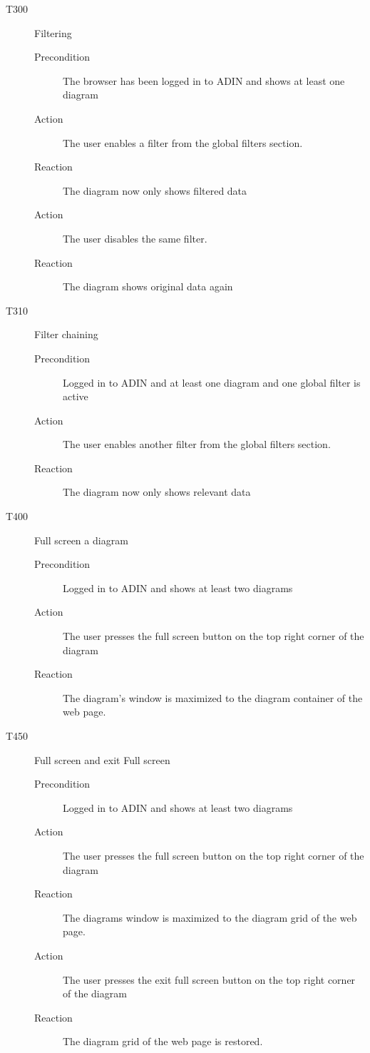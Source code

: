\documentclass[twoside, english, draft]{Pflichtenheft}
\begin{document}
\begin{description}
	\item[T300] Filtering
	      \begin{description}
		      \item[Precondition]
		            The browser has been logged in to ADIN and shows at least one diagram
		      \item[Action]
		            The user enables a filter from the global filters section.
		      \item[Reaction]
		            The diagram now only shows filtered data
		      \item[Action]
		            The user disables the same filter.
		      \item[Reaction]
		            The diagram shows original data again
	      \end{description}

	\item[T310] Filter chaining
	      \begin{description}
		      \item[Precondition]
		            Logged in to ADIN and at least one diagram and one global filter is active
		      \item[Action]
		            The user enables another filter from the global filters section.
		      \item[Reaction]
		            The diagram now only shows relevant data
	      \end{description}

	\item[T400] Full screen a diagram
	      \begin{description}
		      \item[Precondition]
		            Logged in to ADIN and shows at least two diagrams
		      \item[Action]
		            The user presses the full screen button on the top right corner of the diagram
		      \item[Reaction]
		            The diagram's window is maximized to the \gls{diagram container} of the web page.
	      \end{description}

	\item[T450] Full screen and exit Full screen
	      \begin{description}
		      \item[Precondition]
		            Logged in to ADIN and shows at least two diagrams
		      \item[Action]
		            The user presses the full screen button on the top right corner of the diagram
		      \item[Reaction]
		            The diagrams window is maximized to the diagram grid of the web page.
		      \item[Action]
		            The user presses the exit full screen button on the top right corner of the diagram
		      \item[Reaction]
		            The diagram grid of the web page is restored.
	      \end{description}


\end{description}
\end{document}
